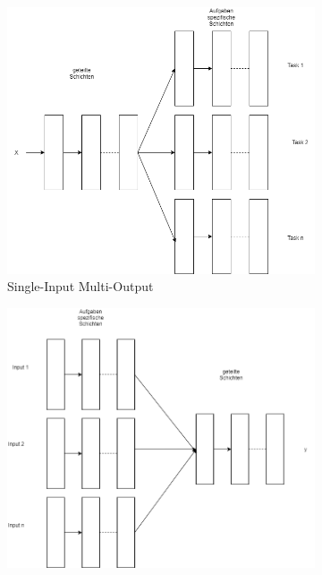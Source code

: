 		\begin{figure}[h]
			\centering
			\begin{subfigure}[c]{0.6\textwidth}			
				\includegraphics[width=1\textwidth, center]{bilder/Grundlagen/MTL/MTL_SIMO.png}
				\caption[MTL-SIMO]{Single-Input Multi-Output}
				\label{img:MTL_SIMO}	
			\end{subfigure}
			\begin{subfigure}[c]{0.49\textwidth}			
				\includegraphics[width=1\textwidth, center]{bilder/Grundlagen/MTL/MTL_MISO.png}

\end{subfigure}
\end{figure}
